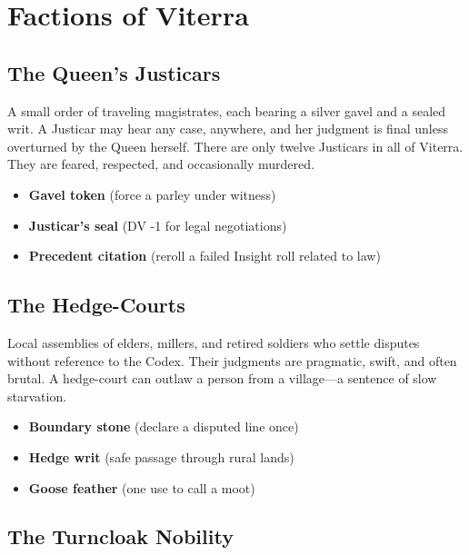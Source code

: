\documentclass[11pt,twoside]{book}
\newenvironment{sidebar}[1][]
{\begin{tcolorbox}[colback=agedpaper,colframe=royalblue,boxrule=0.5pt,arc=2mm,title={\scshape\small #1},fonttitle=\bfseries,breakable]}
{\end{tcolorbox}}
\newcommand{\ornament}{\par\centering\adforn{36}\par}
\begin{document}
\ornament

\chapter{Factions of Viterra}

\section{The Queen's Justicars}

A small order of traveling magistrates, each bearing a silver gavel and a sealed writ. A Justicar may hear any case, anywhere, and her judgment is final unless overturned by the Queen herself. There are only twelve Justicars in all of Viterra. They are feared, respected, and occasionally murdered.

\begin{sidebar}[Strings]
\begin{itemize}
    \item \textbf{Gavel token} (force a parley under witness)
    \item \textbf{Justicar's seal} (DV -1 for legal negotiations)
    \item \textbf{Precedent citation} (reroll a failed Insight roll related to law)
\end{itemize}
\end{sidebar}

\section{The Hedge-Courts}

Local assemblies of elders, millers, and retired soldiers who settle disputes without reference to the Codex. Their judgments are pragmatic, swift, and often brutal. A hedge-court can outlaw a person from a village---a sentence of slow starvation.

\begin{sidebar}[Strings]
\begin{itemize}
    \item \textbf{Boundary stone} (declare a disputed line once)
    \item \textbf{Hedge writ} (safe passage through rural lands)
    \item \textbf{Goose feather} (one use to call a moot)
\end{itemize}
\end{sidebar}

\section{The Turncloak Nobility}
\end{document}
